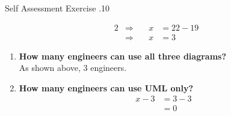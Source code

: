 \documentclass[../notes.tex]{subfiles}
\begin{document}
\begin{exercise}{Self Assessment Exercise \thechapter.10}
\begin{enumerate}
\begin{alignat*}{2}
							& \Rightarrow \quad & x &= 22 - 19\\
							& \Rightarrow \quad & x &= 3
						\end{alignat*}
						\begin{enumerate}
							\item \textbf{How many engineers can use all three diagrams?}\\
								As shown above, $3$ engineers.
							\item \textbf{How many engineers can use UML only?}
								\begin{align*}
									x - 3 &= 3 - 3\\
									&= 0
								\end{align*}
						\end{enumerate}
					\end{enumerate}
				\end{exercise}
\end{document}
